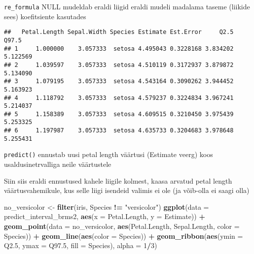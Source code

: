 \documentclass[]{article}
\newenvironment{Shaded}{\begin{snugshade}}{\end{snugshade}}
\newcommand{\KeywordTok}[1]{\textcolor[rgb]{0.13,0.29,0.53}{\textbf{#1}}}
\newcommand{\DataTypeTok}[1]{\textcolor[rgb]{0.13,0.29,0.53}{#1}}
\newcommand{\DecValTok}[1]{\textcolor[rgb]{0.00,0.00,0.81}{#1}}
\newcommand{\StringTok}[1]{\textcolor[rgb]{0.31,0.60,0.02}{#1}}
\newcommand{\OtherTok}[1]{\textcolor[rgb]{0.56,0.35,0.01}{#1}}
\newcommand{\OperatorTok}[1]{\textcolor[rgb]{0.81,0.36,0.00}{\textbf{#1}}}
\newcommand{\NormalTok}[1]{#1}
\begin{document}
\texttt{re\_formula} NULL mudeldab eraldi liigid eraldi mudeli madalama
taseme (liikide sees) koefitsiente kasutades

\begin{Shaded}
\end{Shaded}

\begin{verbatim}
##   Petal.Length Sepal.Width Species Estimate Est.Error     Q2.5    Q97.5
## 1     1.000000    3.057333  setosa 4.495043 0.3228168 3.834202 5.122569
## 2     1.039597    3.057333  setosa 4.510119 0.3172937 3.879872 5.134090
## 3     1.079195    3.057333  setosa 4.543164 0.3090262 3.944452 5.163923
## 4     1.118792    3.057333  setosa 4.579237 0.3224834 3.967241 5.214037
## 5     1.158389    3.057333  setosa 4.609515 0.3210450 3.975439 5.253325
## 6     1.197987    3.057333  setosa 4.635733 0.3204683 3.978648 5.255431
\end{verbatim}

\texttt{predict()} ennustab uusi petal length väärtusi (Estimate veerg)
koos usaldusinetrvalliga neile väärtustele

Siin siis eraldi ennustused kahele liigile kolmest, kaasa arvatud petal
length väärtusvahemikule, kus selle liigi isendeid valimis ei ole (ja
võib-olla ei saagi olla)

\begin{Shaded}
\begin{Highlighting}[]
\NormalTok{no_versicolor <-}\StringTok{ }\KeywordTok{filter}\NormalTok{(iris, Species }\OperatorTok{!=}\StringTok{ "versicolor"}\NormalTok{)}
\KeywordTok{ggplot}\NormalTok{(}\DataTypeTok{data =}\NormalTok{ predict_interval_brms2, }\KeywordTok{aes}\NormalTok{(}\DataTypeTok{x =}\NormalTok{ Petal.Length, }\DataTypeTok{y =}\NormalTok{ Estimate)) }\OperatorTok{+}
\StringTok{  }\KeywordTok{geom_point}\NormalTok{(}\DataTypeTok{data =}\NormalTok{ no_versicolor, }\KeywordTok{aes}\NormalTok{(Petal.Length, Sepal.Length, }\DataTypeTok{color =}\NormalTok{ Species)) }\OperatorTok{+}
\StringTok{  }\KeywordTok{geom_line}\NormalTok{(}\KeywordTok{aes}\NormalTok{(}\DataTypeTok{color =}\NormalTok{ Species)) }\OperatorTok{+}
\StringTok{  }\KeywordTok{geom_ribbon}\NormalTok{(}\KeywordTok{aes}\NormalTok{(}\DataTypeTok{ymin =}\NormalTok{ Q2.}\DecValTok{5}\NormalTok{, }\DataTypeTok{ymax =}\NormalTok{ Q97.}\DecValTok{5}\NormalTok{, }\DataTypeTok{fill =}\NormalTok{ Species), }\DataTypeTok{alpha =} \DecValTok{1}\OperatorTok{/}\DecValTok{3}\NormalTok{)}
\end{Highlighting}
\end{Shaded}
\end{document}
